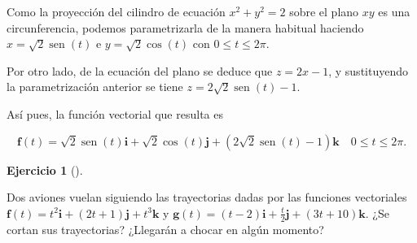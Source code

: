 \documentclass[
  spanish,
  a4paper,
]{scrreport}
\theoremstyle{definition}
\newtheorem{exercise}{Ejercicio}[chapter]
\theoremstyle{remark}
\begin{document}
\begin{tcolorbox}[enhanced jigsaw, arc=.35mm, bottomrule=.15mm, bottomtitle=1mm, breakable, colback=white, colbacktitle=quarto-callout-tip-color!10!white, colframe=quarto-callout-tip-color-frame, coltitle=black, left=2mm, leftrule=.75mm, opacityback=0, opacitybacktitle=0.6, rightrule=.15mm, title=\textcolor{quarto-callout-tip-color}{\faLightbulb}\hspace{0.5em}{Solución}, titlerule=0mm, toprule=.15mm, toptitle=1mm]

Como la proyección del cilindro de ecuación \(x^2+y^2=2\) sobre el plano
\(xy\) es una circunferencia, podemos parametrizarla de la manera
habitual haciendo \(x=\sqrt{2}\operatorname{sen}(t)\) e
\(y=\sqrt{2}\cos(t)\) con \(0\leq t \leq 2\pi\).

Por otro lado, de la ecuación del plano se deduce que \(z = 2x-1\), y
sustituyendo la parametrización anterior se tiene
\(z = 2\sqrt{2}\operatorname{sen}(t)-1\).

Así pues, la función vectorial que resulta es

\[
\mathbf{f}(t) = \sqrt{2}\operatorname{sen}(t)\mathbf{i} + \sqrt{2}\cos(t)\mathbf{j} + (2\sqrt{2}\operatorname{sen}(t)-1)\mathbf{k} \quad 0\leq t \leq 2\pi.
\]

\end{tcolorbox}

\begin{exercise}[]\protect\hypertarget{exr-intersección-trayectorias}{}\label{exr-intersección-trayectorias}

Dos aviones vuelan siguiendo las trayectorias dadas por las funciones
vectoriales
\(\mathbf{f}(t)=t^2\mathbf{i}+(2t+1)\mathbf{j}+t^3\mathbf{k}\) y
\(\mathbf{g}(t)=(t-2)\mathbf{i}+\frac{t}{2}\mathbf{j}+(3t+10)\mathbf{k}\).
¿Se cortan sus trayectorias? ¿Llegarán a chocar en algún momento?

\end{exercise}
\end{document}
